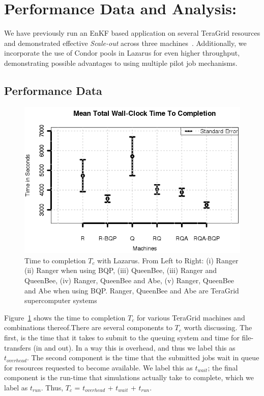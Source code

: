 \documentclass{acm_proc_article-sp}
\newcommand{\tc}{$T_c$ }
\newcommand{\jhanote}[1]{ {\textcolor{red} { ***Jha: #1 }}}
\newcommand{\jhanote}[1]{}
\begin{document}
\section{Performance Data and Analysis:} 

We have previously run an EnKF based application on several TeraGrid
resources and demonstrated effective {\it Scale-out} across three
machines~\cite{gmac}.  Additionally, we incorporate the use of Condor
pools in Lazarus for even higher throughput, demonstrating possible
advantages to using multiple pilot job mechanisms. %

\subsection{Performance Data} 

\begin{figure}
\begin{center}
  \includegraphics*[scale=0.5,angle=0]{figures/Figure7.png}
\end{center}
\caption{Time to completion \tc with Lazarus. From Left to Right: (i)
  Ranger (ii) Ranger when using BQP, (iii) QueenBee, (iii) Ranger and
  QueenBee, (iv) Ranger, QueenBee and Abe, (v) Ranger, QueenBee and
  Abe when using BQP. Ranger, QueenBee and Abe are TeraGrid supercomputer
  systems}
\label{fig:SingleVsDistributed}
\end{figure}


Figure~\ref{fig:SingleVsDistributed} shows the time to completion \tc for various TeraGrid machines and 
combinations thereof.There are several components to \tc worth discussing. The first, is the time that it takes to 
submit to the queuing system and time for file-transfers (in and out). In a way this is overhead, and thus we 
label this as $t_{overhead}$.  The second component is the time that the submitted jobs wait in queue for 
resources requested to become available. We label this as $t_{wait}$; the final component is the run-time that 
simulations actually take to complete, which we label as $t_{run}$. Thus, \tc = $t_{overhead}$ + $t_{wait}$ + 
$t_{run}$.
\end{document}
